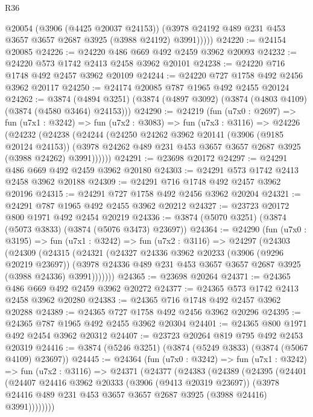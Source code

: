 \begin{lexlean}{R36}
\begin{coremodule}
            @20054
            (@3906 (@4425 @20037 @24153))
            (@3978 @24192 @489 @231 @453 @3657 @3657 @2687 @3925 (@3988 @24192) @3991)))))
@24220 := @24154 @20085
@24226 := @24220 @486 @669 @492 @2459 @3962 @20093
@24232 := @24220 @573 @1742 @2413 @2458 @3962 @20101
@24238 := @24220 @716 @1748 @492 @2457 @3962 @20109
@24244 := @24220 @727 @1758 @492 @2456 @3962 @20117
@24250 := @24174 @20085 @787 @1965 @492 @2455 @20124
@24262 := @3874
    (@4894 @3251)
    (@3874 (@4897 @3092) (@3874 (@4803 @4109) (@3874 (@4580 @3464) @24153)))
@24290 := @24219
    (fun (u7x0 : @2697) =>
    fun (u7x1 : @3242) =>
    fun (u7x2 : @3083) =>
    fun (u7x3 : @3116) =>
    @24226
      (@24232
        (@24238
          (@24244
            (@24250
              @24262
              @3962
              @20141
              (@3906 (@9185 @20124 @24153))
              (@3978 @24262 @489 @231 @453 @3657 @3657 @2687 @3925 (@3988 @24262) @3991))))))
@24291 := @23698 @20172
@24297 := @24291 @486 @669 @492 @2459 @3962 @20180
@24303 := @24291 @573 @1742 @2413 @2458 @3962 @20188
@24309 := @24291 @716 @1748 @492 @2457 @3962 @20196
@24315 := @24291 @727 @1758 @492 @2456 @3962 @20204
@24321 := @24291 @787 @1965 @492 @2455 @3962 @20212
@24327 := @23723 @20172 @800 @1971 @492 @2454 @20219
@24336 := @3874 (@5070 @3251) (@3874 (@5073 @3833) (@3874 (@5076 @3473) @23697))
@24364 := @24290
    (fun (u7x0 : @3195) =>
    fun (u7x1 : @3242) =>
    fun (u7x2 : @3116) =>
    @24297
      (@24303
        (@24309
          (@24315
            (@24321
              (@24327
                @24336
                @3962
                @20233
                (@3906 (@9296 @20219 @23697))
                (@3978 @24336 @489 @231 @453 @3657 @3657 @2687 @3925 (@3988 @24336) @3991)))))))
@24365 := @23698 @20264
@24371 := @24365 @486 @669 @492 @2459 @3962 @20272
@24377 := @24365 @573 @1742 @2413 @2458 @3962 @20280
@24383 := @24365 @716 @1748 @492 @2457 @3962 @20288
@24389 := @24365 @727 @1758 @492 @2456 @3962 @20296
@24395 := @24365 @787 @1965 @492 @2455 @3962 @20304
@24401 := @24365 @800 @1971 @492 @2454 @3962 @20312
@24407 := @23723 @20264 @819 @795 @492 @2453 @20319
@24416 := @3874 (@5246 @3251) (@3874 (@5249 @3833) (@3874 (@5067 @4109) @23697))
@24445 := @24364
    (fun (u7x0 : @3242) =>
    fun (u7x1 : @3242) =>
    fun (u7x2 : @3116) =>
    @24371
      (@24377
        (@24383
          (@24389
            (@24395
              (@24401
                (@24407
                  @24416
                  @3962
                  @20333
                  (@3906 (@9413 @20319 @23697))
                  (@3978 @24416 @489 @231 @453 @3657 @3657 @2687 @3925 (@3988 @24416) @3991))))))))

\end{coremodule}
\end{lexlean}
